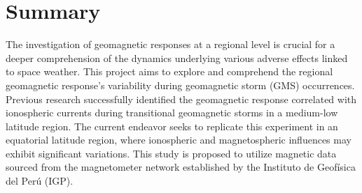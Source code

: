 \documentclass[12pt]{article}
\begin{document}
\section*{Summary}
The investigation of geomagnetic responses at a regional level is crucial for a deeper comprehension of the dynamics underlying various adverse effects linked to space weather. This project aims to explore and comprehend the regional geomagnetic response's variability during geomagnetic storm (GMS) occurrences. Previous research successfully identified the geomagnetic response correlated with ionospheric currents during transitional geomagnetic storms in a medium-low latitude region. The current endeavor seeks to replicate this experiment in an equatorial latitude region, where ionospheric and magnetospheric influences may exhibit significant variations. This study is proposed to utilize magnetic data sourced from the magnetometer network established by the Instituto de Geofísica del Perú (IGP).







\end{document}

